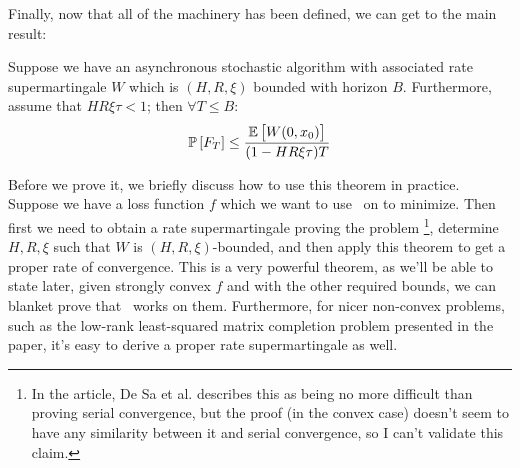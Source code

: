 Finally, now that all of the machinery has been defined, we can get to the main
result:
\begin{theorem} \label{thm:convergence}
  Suppose we have an asynchronous stochastic algorithm with associated rate
  supermartingale $W$ which is $(H,R,\xi)$ bounded with horizon $B$.
  Furthermore, assume that $HR\xi \tau < 1$; then $\forall T \leq B$:
  \[
    \mathbb{P}\left[F_T\right] \leq \frac{\mathbb{E}\left[W(0, x_0)\right]}{(1-HR\xi\tau)T}
  \]
\end{theorem}
Before we prove it, we briefly discuss how to use this theorem in practice.
Suppose we have a loss function $f$ which we want to use \hogwild\ on to
minimize. Then first we need to obtain a rate supermartingale proving the
problem%
\footnote{
  In the article, De Sa et al. describes this as being no more difficult than
  proving serial convergence, but the proof (in the convex case) doesn't seem to
  have any similarity between it and serial convergence, so I can't validate
  this claim.
}, determine $H, R, \xi$ such that $W$ is $(H,R,\xi)$-bounded, and then apply
this theorem to get a proper rate of convergence. This is a very powerful
theorem, as we'll be able to state later, given strongly convex $f$ and with the
other required bounds, we can blanket prove that \hogwild\ works on them.
Furthermore, for nicer non-convex problems, such as the low-rank least-squared
matrix completion problem presented in the paper, it's easy to derive a proper
rate supermartingale as well.

